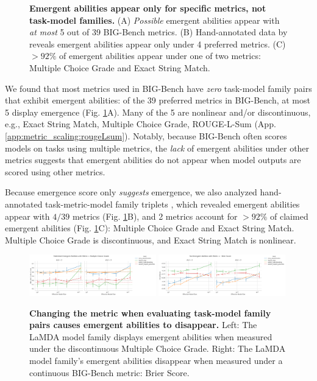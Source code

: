 \begin{figure}
\begin{minipage}[c]{0.3\textwidth}
     \end{minipage}
    \caption{\textbf{Emergent abilities appear only for specific metrics, not task-model families.} (A) \textit{Possible} emergent abilities appear with \textit{at most} 5 out of 39 BIG-Bench metrics. (B) Hand-annotated data by \cite{wei2022bigbench} reveals emergent abilities appear only under 4 preferred metrics. (C) $>92\%$ of emergent abilities appear under one of two metrics: Multiple Choice Grade and Exact String Match.}
    \label{fig:big_bench_breakthrough_scores_by_metric}
\end{figure}

We found that most metrics used in BIG-Bench have \textit{zero} task-model family pairs that exhibit emergent abilities: of the 39 preferred metrics in BIG-Bench, at most 5 display emergence (Fig. \ref{fig:big_bench_breakthrough_scores_by_metric}A). Many of the 5 are nonlinear and/or discontinuous, e.g., Exact String Match, Multiple Choice Grade, ROUGE-L-Sum (App. \ref{app:metric_scaling:rougeLsum}). Notably, because BIG-Bench often scores models on tasks using multiple metrics, the \textit{lack} of emergent abilities under other metrics suggests that emergent abilities do not appear when model outputs are scored using other metrics.

Because emergence score only \textit{suggests} emergence, we also analyzed hand-annotated task-metric-model family triplets \cite{wei2022bigbench}, which revealed emergent abilities appear with $4 / 39$ metrics (Fig. \ref{fig:big_bench_breakthrough_scores_by_metric}B), and 2 metrics account for $>92\%$ of claimed emergent abilities (Fig. \ref{fig:big_bench_breakthrough_scores_by_metric}C): Multiple Choice Grade and Exact String Match. Multiple Choice Grade is discontinuous, and Exact String Match is nonlinear.


 \begin{figure}
    \centering
    \includegraphics[width=0.49\textwidth]{figures/big_bench_emergent_tasks/score_vs_model_size_by_task_split_shot_other_metric=multiple_choice_grade.png}%
    \includegraphics[width=0.49\textwidth]{figures/big_bench_emergent_tasks/score_vs_model_size_by_task_split_shot_other_metric=calibration_multiple_choice_brier_score.png}
    \caption{\textbf{Changing the metric when evaluating task-model family pairs causes emergent abilities to disappear.} Left: The LaMDA model family displays emergent abilities when measured under the discontinuous Multiple Choice Grade. Right: The LaMDA model family's emergent abilities disappear when measured under a continuous BIG-Bench metric: Brier Score.}
    \label{fig:big_bench_brier_score}
\end{figure}

